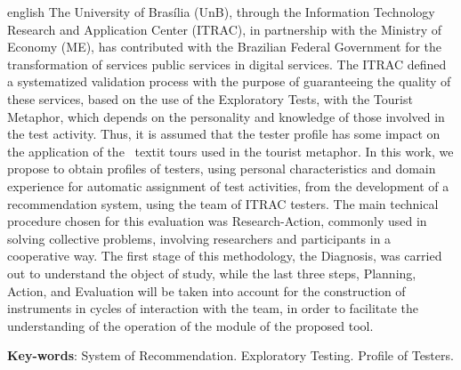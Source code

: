 \begin{resumo}[Abstract]
 \begin{otherlanguage*}{english}
   The University of Brasília (UnB), through the Information Technology Research and Application Center (ITRAC), in partnership with the Ministry of Economy (ME), has contributed with the Brazilian Federal Government for the transformation of services public services in digital services. The ITRAC defined a systematized validation process with the purpose of guaranteeing the quality of these services, based on the use of the Exploratory Tests, with the Tourist Metaphor, which depends on the personality and knowledge of those involved in the test activity. Thus, it is assumed that the tester profile has some impact on the application of the \ textit {tours} used in the tourist metaphor. In this work, we propose to obtain profiles of testers, using personal characteristics and domain experience for automatic assignment of test activities, from the development of a recommendation system, using the team of ITRAC testers. The main technical procedure chosen for this evaluation was Research-Action, commonly used in solving collective problems, involving researchers and participants in a cooperative way. The first stage of this methodology, the Diagnosis, was carried out to understand the object of study, while the last three steps, Planning, Action, and Evaluation will be taken into account for the construction of instruments in cycles of interaction with the team, in order to facilitate the understanding of the operation of the module of the proposed tool.

   \vspace{\onelineskip}

   \noindent
   \textbf{Key-words}: System of Recommendation. Exploratory Testing. Profile of Testers.
 \end{otherlanguage*}
\end{resumo}
